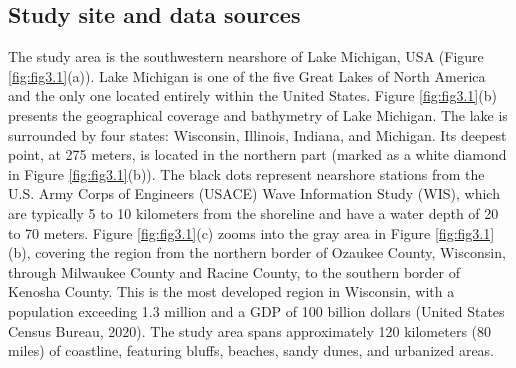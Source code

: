 \subsection{Study site and data sources}
\label{c3_Study site and data sources}

The study area is the southwestern nearshore of Lake Michigan, USA (Figure
\ref{fig:fig3.1}(a)). Lake Michigan is one of the five Great Lakes of North
America and the only one located entirely within the United States. Figure
\ref{fig:fig3.1}(b) presents the geographical coverage and bathymetry of Lake
Michigan. The lake is surrounded by four states: Wisconsin, Illinois, Indiana,
and Michigan. Its deepest point, at 275 meters, is located in the northern part
(marked as a white diamond in Figure \ref{fig:fig3.1}(b)). The black dots
represent nearshore stations from the U.S. Army Corps of Engineers (USACE) Wave
Information Study (WIS), which are typically 5 to 10 kilometers from the
shoreline and have a water depth of 20 to 70 meters. Figure \ref{fig:fig3.1}(c)
zooms into the gray area in Figure \ref{fig:fig3.1}(b), covering the region from
the northern border of Ozaukee County, Wisconsin, through Milwaukee County and
Racine County, to the southern border of Kenosha County. This is the most
developed region in Wisconsin, with a population exceeding 1.3 million and a GDP
of 100 billion dollars (United States Census Bureau, 2020). The study area spans
approximately 120 kilometers (80 miles) of coastline, featuring bluffs, beaches,
sandy dunes, and urbanized areas. 

